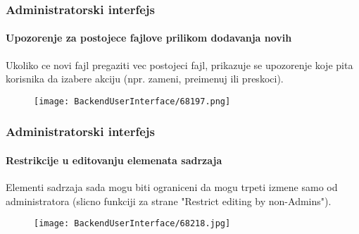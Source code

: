 \begin{frame}[fragile]
	\frametitle{Administratorski interfejs}
	\framesubtitle{Upozorenje za postojece fajlove prilikom dodavanja novih}

	Ukoliko ce novi fajl pregaziti vec postojeci fajl, prikazuje se upozorenje koje pita korisnika da izabere akciju (npr. zameni, preimenuj ili preskoci).

	\begin{figure}
		\texttt{[image: BackendUserInterface/68197.png]}
	\end{figure}

\end{frame}


\begin{frame}[fragile]
	\frametitle{Administratorski interfejs}
	\framesubtitle{Restrikcije u editovanju elemenata sadrzaja}

	Elementi sadrzaja sada mogu biti ograniceni da mogu trpeti izmene samo od administratora (slicno funkciji za strane "Restrict editing by non-Admins").

	\begin{figure}
		\texttt{[image: BackendUserInterface/68218.jpg]}
	\end{figure}

\end{frame}

